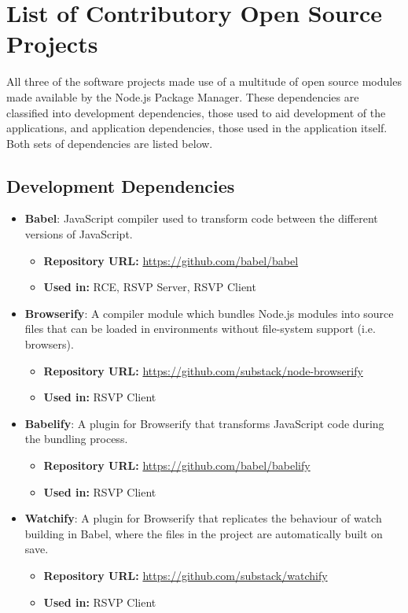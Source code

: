 \chapter{List of Contributory Open Source Projects}
\label{appendix:openSourceList}
  All three of the software projects made use of a multitude of open source modules made available by the Node.js Package Manager. These dependencies are classified into development dependencies, those used to aid development of the applications, and application dependencies, those used in the application itself. Both sets of dependencies are listed below.
  
  \section{Development Dependencies}
    \begin{itemize}
    \item \textbf{Babel}: JavaScript compiler used to transform code between the different versions of JavaScript.
      \begin{itemize}
        \item \textbf{Repository URL:} \url{https://github.com/babel/babel}
        \item \textbf{Used in:} RCE, RSVP Server, RSVP Client
      \end{itemize}
      
    \item \textbf{Browserify}: A compiler module which bundles Node.js modules into source files that can be loaded in environments without file-system support (i.e. browsers).
      \begin{itemize}
        \item \textbf{Repository URL:} \url{https://github.com/substack/node-browserify}
        \item \textbf{Used in:} RSVP Client
      \end{itemize}
      
    \item \textbf{Babelify}: A plugin for Browserify that transforms JavaScript code during the bundling process.
      \begin{itemize}
        \item \textbf{Repository URL:} \url{https://github.com/babel/babelify}
        \item \textbf{Used in:} RSVP Client
      \end{itemize}
      
    \item \textbf{Watchify}: A plugin for Browserify that replicates the behaviour of watch building in Babel, where the files in the project are automatically built on save.
      \begin{itemize}
        \item \textbf{Repository URL:} \url{https://github.com/substack/watchify}
        \item \textbf{Used in:} RSVP Client
      \end{itemize}
      

\end{itemize}
